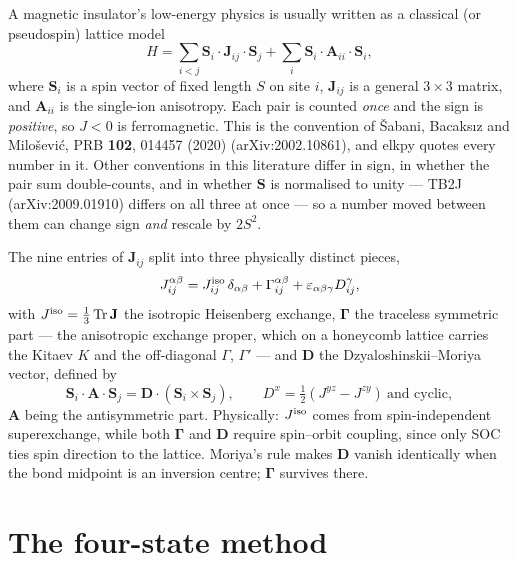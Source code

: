 \documentclass[11pt]{article}
\begin{document}
A magnetic insulator's low-energy physics is usually written as a classical (or
pseudospin) lattice model
\begin{equation}
  H=\sum_{i<j}\mathbf S_i\cdot\mathbf J_{ij}\cdot\mathbf S_j
   +\sum_i\mathbf S_i\cdot\mathbf A_{ii}\cdot\mathbf S_i ,
  \label{eq:exchange-hamiltonian}
\end{equation}
where $\mathbf S_i$ is a spin vector of fixed length $S$ on site $i$,
$\mathbf J_{ij}$ is a general $3\times3$ matrix, and $\mathbf A_{ii}$ is the
single-ion anisotropy. Each pair is counted \emph{once} and the sign is
\emph{positive}, so $J<0$ is ferromagnetic. This is the convention of
\v{S}abani, Bacaks\i z and Milo\v{s}evi\'c, PRB \textbf{102}, 014457 (2020)
(arXiv:2002.10861), and elkpy quotes every number in it. Other conventions in
this literature differ in sign, in whether the pair sum double-counts, and in
whether $\mathbf S$ is normalised to unity --- TB2J (arXiv:2009.01910) differs
on all three at once --- so a number moved between them can change sign
\emph{and} rescale by $2S^2$.

The nine entries of $\mathbf J_{ij}$ split into three physically distinct
pieces,
\begin{equation}
  J_{ij}^{\alpha\beta}=J^{\rm iso}_{ij}\,\delta_{\alpha\beta}
    +\Gamma_{ij}^{\alpha\beta}
    +\varepsilon_{\alpha\beta\gamma}D_{ij}^{\gamma},
  \label{eq:exchange-decomposition}
\end{equation}
with $J^{\rm iso}=\tfrac13\operatorname{Tr}\mathbf J$ the isotropic Heisenberg
exchange, $\boldsymbol\Gamma$ the traceless symmetric part --- the anisotropic
exchange proper, which on a honeycomb lattice carries the Kitaev $K$ and the
off-diagonal $\Gamma$, $\Gamma'$ --- and $\mathbf D$ the Dzyaloshinskii--Moriya
vector, defined by
\begin{equation}
  \mathbf S_i\cdot\mathbf A\cdot\mathbf S_j=\mathbf D\cdot(\mathbf S_i\times\mathbf S_j),
  \qquad
  D^x=\tfrac12\left(J^{yz}-J^{zy}\right)\ \text{and cyclic},
  \label{eq:dm-vector}
\end{equation}
$\mathbf A$ being the antisymmetric part. Physically: $J^{\rm iso}$ comes from
spin-independent superexchange, while both $\boldsymbol\Gamma$ and $\mathbf D$
require spin--orbit coupling, since only SOC ties spin direction to the lattice.
Moriya's rule makes $\mathbf D$ vanish identically when the bond midpoint is an
inversion centre; $\boldsymbol\Gamma$ survives there.

\section{The four-state method}
\end{document}
